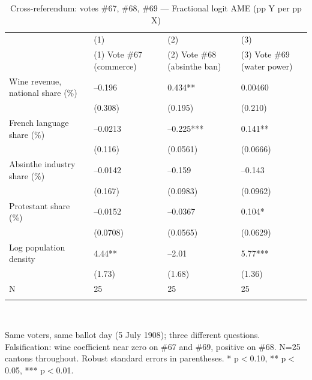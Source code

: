 \begin{table}[tbp] \centering
{}

\caption{Cross-referendum: votes \#67, \#68, \#69 --- Fractional logit AME (pp Y per pp X)}
\label{tab:T8_FL}
\begin{tabularx}{\linewidth}{@{}lCCC@{}}

\toprule
&{(1)}&{(2)}&{(3)} \tabularnewline
 & (1) Vote \#67 (commerce) & (2) Vote \#68 (absinthe ban) & (3) Vote \#69 (water power) \tabularnewline 
\midrule \addlinespace[\belowrulesep]
Wine revenue, national share (\%)&--0.196&0.434**&0.00460 \tabularnewline
&(0.308)&(0.195)&(0.210) \tabularnewline
French language share (\%)&--0.0213&--0.225***&0.141** \tabularnewline
&(0.116)&(0.0561)&(0.0666) \tabularnewline
Absinthe industry share (\%)&--0.0142&--0.159&--0.143 \tabularnewline
&(0.167)&(0.0983)&(0.0962) \tabularnewline
Protestant share (\%)&--0.0152&--0.0367&0.104* \tabularnewline
&(0.0708)&(0.0565)&(0.0629) \tabularnewline
Log population density&4.44**&--2.01&5.77*** \tabularnewline
&(1.73)&(1.68)&(1.36) \tabularnewline
\midrule N&25&25&25 \tabularnewline
\bottomrule \addlinespace[\belowrulesep]

\end{tabularx}
\\ \parbox{\linewidth}{\footnotesize Same voters, same ballot day (5 July 1908); three different questions. Falsification: wine coefficient near zero on \#67 and \#69, positive on \#68. N=25 cantons throughout. Robust standard errors in parentheses. * p\(<\)0.10, ** p\(<\)0.05, *** p\(<\)0.01.}
\end{table}
